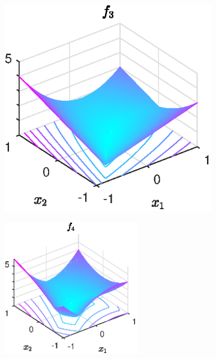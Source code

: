 \begin{figure}[H]
\begin{subfigure}[t]{0.32\textwidth}
	\end{subfigure}
	\begin{subfigure}[t]{0.32\textwidth}
		\includegraphics[width=\textwidth]{Pictures/Plots/testfun_f3.eps}
	\end{subfigure}
	\newline
	\begin{subfigure}{0.49\textwidth}
		\begin{flushright}
		\includegraphics[width=0.64\textwidth]{Pictures/Plots/testfun_f4}
		\end{flushright}
	\end{subfigure}

\end{figure}

